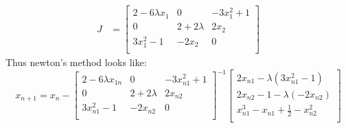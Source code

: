 \documentclass{article}
\begin{document}
\begin{enumerate}[label=\alph*.)]
\begin{align*}
J &= \begin{bmatrix}
2 - 6\lambda x_1 & 0 & -3x_1^2 + 1 \\
0 & 2 + 2\lambda & 2x_2 \\
3x_1^2 - 1 & -2x_2 & 0 \\
\end{bmatrix}
\end{align*}
Thus newton's method looks like:\\
\[
x_{n+1} = x_{n} -  \begin{bmatrix}
2 - 6\lambda x_{1n} & 0 & -3x_{n1}^2 + 1 \\
0 & 2 + 2\lambda & 2x_{n2} \\
3x_{n1}^2 - 1 & -2x_{n2} & 0 \\
\end{bmatrix}^{-1}
\begin{bmatrix}
2x_{n1} - \lambda(3x_{n1}^2 - 1) \\
2x_{n2} - 1 - \lambda(-2x_{n2}) \\
x_{n1}^3 - x_{n1} + \frac{1}{2} - x_{n2}^2 \\
\end{bmatrix}
\]
\end{enumerate}
\end{document}
